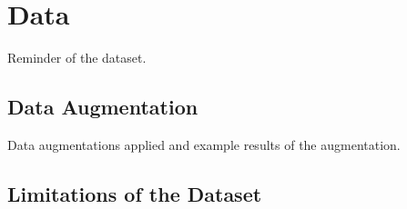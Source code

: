 \chapter{Data} \label{chap:data}
Reminder of the dataset.~\cite{openi} 

\section{Data Augmentation}
Data augmentations applied and example results of the augmentation.

\section{Limitations of the Dataset}

\clearpage